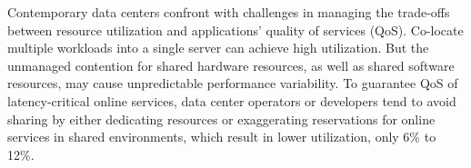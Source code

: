 
\begin{eabstract}
  Contemporary data centers confront with challenges in
  managing the trade-offs between resource utilization and
  applications’ quality of services (QoS). Co-locate
  multiple workloads into a single server can achieve high
  utilization. But the unmanaged contention for shared
  hardware resources, as well as shared software resources,
  may cause unpredictable performance variability. To
  guarantee QoS of latency-critical online services, data
  center operators or developers tend to avoid sharing by
  either dedicating resources or exaggerating reservations
  for online services in shared environments, which result
  in lower utilization, only 6\% to 12\%.


\end{eabstract}


